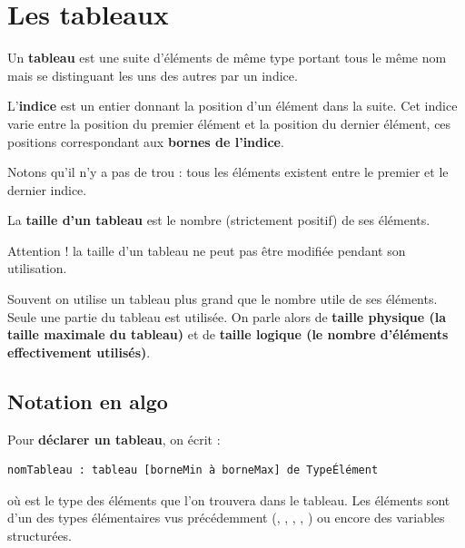 \documentclass[11pt,a4paper]{article}
\begin{document}
            \section{Les tableaux}
        Un \textbf{tableau} est une suite d'\'el\'ements de m\^eme type 
        portant tous le m\^eme nom mais se distinguant les uns des autres par un indice.
      
            \par
        
        L'\textbf{indice} est un entier donnant la position d'un \'el\'ement dans la suite. 
        Cet indice varie entre la position du premier \'el\'ement et la position du dernier \'el\'ement, 
        ces positions correspondant aux \textbf{bornes de l'indice}. \par
				
        Notons qu'il n'y a pas de \guillemotleft  trou \guillemotright  : tous les \'el\'ements existent entre le premier et le dernier indice.
      
            \par
        
        La \textbf{taille d'un tableau} est le nombre (strictement positif) de ses \'el\'ements. \par
				
        Attention ! la taille d'un tableau ne peut pas \^etre modifi\'ee pendant son utilisation.
      
            \par
        
        Souvent on utilise un tableau plus grand que le nombre utile de ses \'el\'ements. 
        Seule une partie du tableau est utilis\'ee. 
        On parle alors de \textbf{taille physique (la taille maximale du tableau)} et
        de \textbf{taille logique (le nombre d'\'el\'ements effectivement utilis\'es)}.
		
            \par
        \subsection{Notation en algo}
        Pour \textbf{d\'eclarer un tableau}, on \'ecrit :
      
            \par
        \begin{verbatim}
nomTableau : tableau [borneMin à borneMax] de TypeÉlément
      \end{verbatim}
        o\`u  est le type des \'el\'ements 
        que l'on trouvera dans le tableau. Les \'el\'ements sont
        d'un des types \'el\'ementaires vus pr\'ec\'edemment 
        (\verb@entier@, , 
        , \verb@chaine@, 
        ) ou encore des variables structur\'ees. 
      
\end{document}
